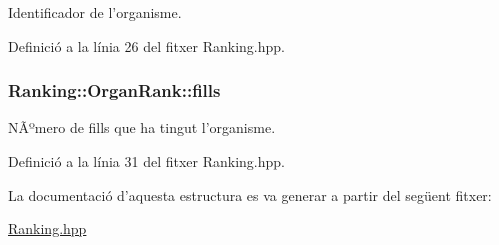 Identificador de l'organisme. 



Definició a la línia 26 del fitxer Ranking.\-hpp.

\hypertarget{struct_ranking_1_1_organ_rank_a127f9a8768fd7cfda05c3cb2f9f8cfee}{
\subsubsection[{fills}]{\setlength{\rightskip}{0pt plus 5cm}Ranking\-::\-Organ\-Rank\-::fills}}\label{struct_ranking_1_1_organ_rank_a127f9a8768fd7cfda05c3cb2f9f8cfee}


NÃºmero de fills que ha tingut l'organisme. 



Definició a la línia 31 del fitxer Ranking.\-hpp.



La documentació d'aquesta estructura es va generar a partir del següent fitxer\-:\begin{DoxyCompactItemize}
\item 
\hyperlink{_ranking_8hpp}{Ranking.\-hpp}\end{DoxyCompactItemize}
